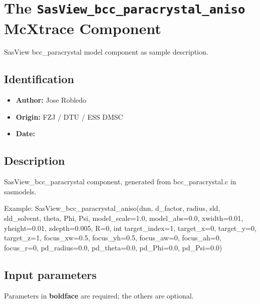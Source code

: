 \section{The \texttt{SasView\_bcc\_paracrystal\_aniso} McXtrace Component}
SasView bcc\_paracrystal model component as sample description.

\subsection*{Identification}
\begin{itemize}
  \item \textbf{Author:} Jose Robledo
  \item \textbf{Origin:} FZJ / DTU / ESS DMSC
  \item \textbf{Date:} 
\end{itemize}

\subsection*{Description}
SasView\_bcc\_paracrystal component, generated from bcc\_paracrystal.c in sasmodels.

Example: SasView\_bcc\_paracrystal\_aniso(dnn, d\_factor, radius, sld, sld\_solvent, theta, Phi, Psi, model\_scale=1.0, model\_abs=0.0, xwidth=0.01, yheight=0.01, zdepth=0.005, R=0, int target\_index=1, target\_x=0, target\_y=0, target\_z=1, focus\_xw=0.5, focus\_yh=0.5, focus\_aw=0, focus\_ah=0, focus\_r=0, pd\_radius=0.0, pd\_theta=0.0, pd\_Phi=0.0, pd\_Psi=0.0)

\subsection*{Input parameters}
Parameters in \textbf{boldface} are required; the others are optional.

